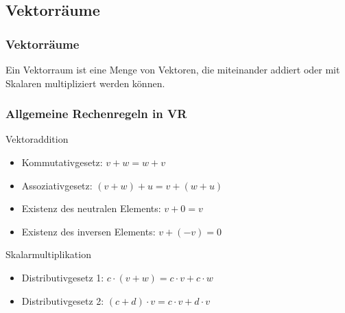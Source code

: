 \subsection{Vektorräume}
\begin{frame}
    \frametitle{Vektorräume}
    Ein Vektorraum ist eine Menge von Vektoren, die miteinander addiert oder mit Skalaren multipliziert werden können.
\end{frame}

\begin{frame}
    \frametitle{Allgemeine Rechenregeln in VR}
    Vektoraddition
    \begin{itemize}
        \item Kommutativgesetz: $v + w = w + v$
        \item Assoziativgesetz: $(v + w) + u = v + (w + u)$
        \item Existenz des neutralen Elements: $v + 0 = v$
        \item Existenz des inversen Elements: $v + (-v) = 0$
    \end{itemize}

    Skalarmultiplikation
    \begin{itemize}
        \item Distributivgesetz 1: $c \cdot (v + w) = c \cdot v + c \cdot w$
        \item Distributivgesetz 2: $(c + d) \cdot v = c \cdot v + d \cdot v$
    \end{itemize}
\end{frame}
